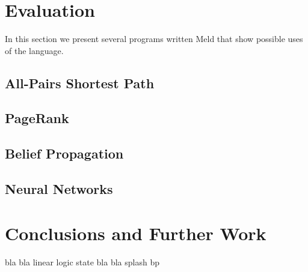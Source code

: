 \documentclass[preprint]{sigplanconf}
\begin{document}
\section{Evaluation}\label{sec:evaluation}

In this section we present several programs written Meld that show possible
uses of the language.

\subsection{All-Pairs Shortest Path}

\subsection{PageRank}

\subsection{Belief Propagation}

\subsection{Neural Networks}

\section{Conclusions and Further Work}

bla bla linear logic state bla bla splash bp

\acks






\end{document}
